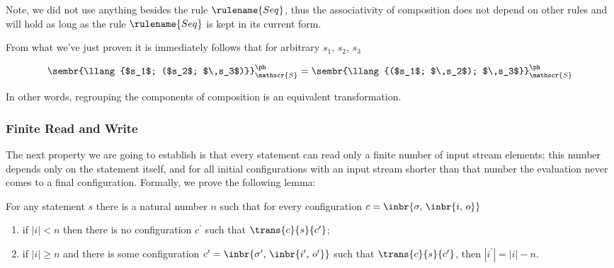 Note, we did not use anything besides the rule $\rulename{Seq}$, thus
the associativity of composition does not depend on other rules and will hold as long as the rule $\rulename{Seq}$
is kept in its current form.

From what we've just proven it is immediately follows that for arbitrary $s_1,\,s_2,\,s_3$

\[
\sembr{\llang{$s_1$; ($s_2$; $\,s_3$)}}^\ph_\mathscr{S}=\sembr{\llang{($s_1$; $\,s_2$); $\,s_3$}}^\ph_\mathscr{S}
\]

In other words, regrouping the components of composition is an equivalent transformation.

\subsubsection{Finite Read and Write}

The next property we are going to establish is that every statement can read only a finite number of input
stream elements; this number depends only on the statement itself, and for all initial configurations with an input stream
shorter than that number the evaluation never comes to a final configuration. Formally, we prove the following lemma:

\begin{lemma} For any statement $s$ there is a natural number $n$ such that for every configuration $c=\inbr{\sigma,\,\inbr{i,\,o}}$

\begin{enumerate}
\item if $|i|<n$ then there is no configuration $c^\prime$ such that $\trans{c}{s}{c^\prime}$;
\item if $|i|\ge n$ and there is some configuration $c^\prime=\inbr{\sigma^\prime,\,\inbr{i^\prime,\,o^\prime}}$ such that $\trans{c}{s}{c^\prime}$, then
  $|i^\prime|=|i|-n$.
\end{enumerate}

\end{lemma}

